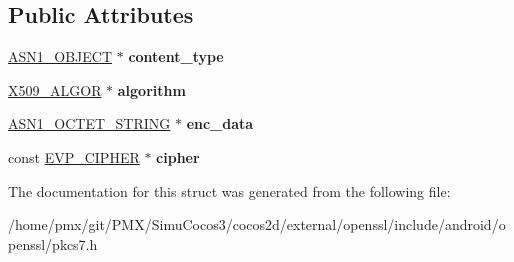 \subsection*{Public Attributes}
\begin{DoxyCompactItemize}
\item 
\mbox{\label{structpkcs7__enc__content__st_ac286df8854d517ce16613caf21450040}} 
\hyperlink{structasn1__object__st}{A\+S\+N1\+\_\+\+O\+B\+J\+E\+CT} $\ast$ {\bfseries content\+\_\+type}
\item 
\mbox{\label{structpkcs7__enc__content__st_a54af646433197f6aa093ca0fb4ddc18b}} 
\hyperlink{structX509__algor__st}{X509\+\_\+\+A\+L\+G\+OR} $\ast$ {\bfseries algorithm}
\item 
\mbox{\label{structpkcs7__enc__content__st_a1b65c2e2a5bf6fdabd262670216ba6ba}} 
\hyperlink{structasn1__string__st}{A\+S\+N1\+\_\+\+O\+C\+T\+E\+T\+\_\+\+S\+T\+R\+I\+NG} $\ast$ {\bfseries enc\+\_\+data}
\item 
\mbox{\label{structpkcs7__enc__content__st_ac9ed4c674791e85c3de9e700ea370ee7}} 
const \hyperlink{structevp__cipher__st}{E\+V\+P\+\_\+\+C\+I\+P\+H\+ER} $\ast$ {\bfseries cipher}
\end{DoxyCompactItemize}


The documentation for this struct was generated from the following file\+:\begin{DoxyCompactItemize}
\item 
/home/pmx/git/\+P\+M\+X/\+Simu\+Cocos3/cocos2d/external/openssl/include/android/openssl/pkcs7.\+h\end{DoxyCompactItemize}
